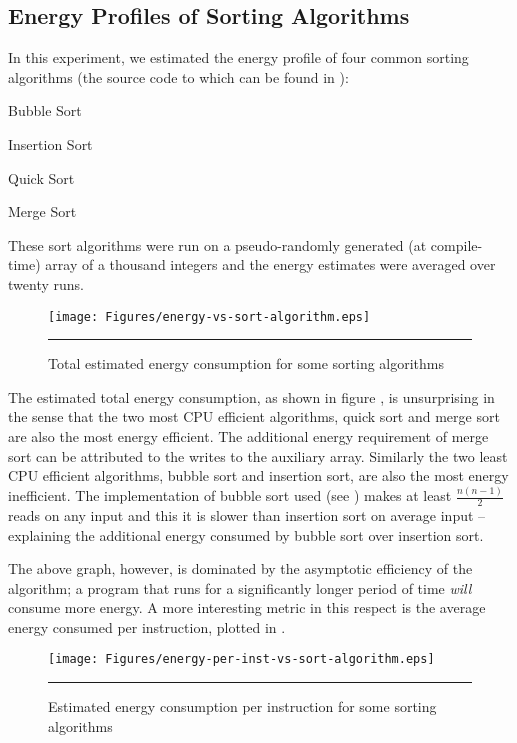\subsection{Energy Profiles of Sorting Algorithms}

In this experiment, we estimated the energy profile of four common
sorting algorithms (the source code to which can be found in
):

\begin{itemize*}
\item Bubble Sort
\item Insertion Sort
\item Quick Sort
\item Merge Sort
\end{itemize*}

These sort algorithms were run on a pseudo-randomly generated (at
compile-time) array of a thousand integers and the energy estimates
were averaged over twenty runs.

\begin{figure}[htbp]
  \centering
  \texttt{[image: Figures/energy-vs-sort-algorithm.eps]}
  \rule{35em}{0.5pt}
  \caption{Total estimated energy consumption for some sorting algorithms}
  \label{fig:total-energy-sort-algo}
\end{figure}

The estimated total energy consumption, as shown in figure
, is unsurprising in the sense that
the two most CPU efficient algorithms, quick sort and merge sort are
also the most energy efficient.  The additional energy requirement of
merge sort can be attributed to the writes to the auxiliary array.
Similarly the two least CPU efficient algorithms, bubble sort and
insertion sort, are also the most energy inefficient.  The
implementation of bubble sort used (see ) makes at
least $\frac{n (n - 1)}{2}$ reads on any input and this it is slower
than insertion sort on average input -- explaining the additional
energy consumed by bubble sort over insertion sort.

The above graph, however, is dominated by the asymptotic efficiency of
the algorithm; a program that runs for a significantly longer period
of time \textit{will} consume more energy.  A more interesting metric
in this respect is the average energy consumed per instruction,
plotted in .

\begin{figure}[htbp]
  \centering
  \texttt{[image: Figures/energy-per-inst-vs-sort-algorithm.eps]}
  \rule{35em}{0.5pt}
  \caption{Estimated energy consumption per instruction for some sorting algorithms}
  \label{fig:energy-per-inst-sort-algo}
\end{figure}

